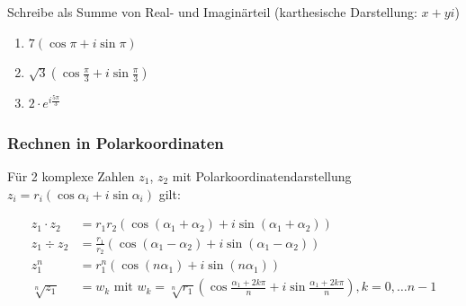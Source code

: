 \documentclass[11pt, a4paper]{article}
\newcommand\braces[1]{\left(#1\right)}
\newif\ifshowsolution
\begin{document}
Schreibe als Summe von Real- und Imaginärteil (karthesische Darstellung: $x + yi$)

\begin{enumerate}
	\item $7 \braces{\cos \pi + i \sin \pi}$
	
	\ifshowsolution
		\begin{align*}
			7 \braces{\cos \pi + i \sin \pi} &= 7 \braces{-1 + i 0} \\
			&= -7
		\end{align*}
	\fi
	
	\item $\sqrt{3} \braces{\cos \frac{\pi}{3} + i \sin \frac{\pi}{3}}$
	
	\ifshowsolution
		\begin{align*}
			\sqrt{3} \braces{\cos \frac{\pi}{3} + i \sin \frac{\pi}{3}} &= \sqrt{3} \braces{\frac{1}{2} + i \frac{\sqrt{3}}{2}} \\
			&= \frac{\sqrt{3}}{2} + i \frac{3}{2}
		\end{align*}
	\fi
	
	\item $2 \cdot e^{i \frac{5 \pi}{3}}$
	
	\ifshowsolution
		\begin{align*}
			2 \cdot e^{i \frac{5 \pi}{3}} &= 2 \braces{\cos \frac{5\pi}{3} + i \sin \frac{5\pi}{3}} \\
			&= 2 \braces{\frac{1}{2} - i \frac{\sqrt{3}}{2}} \\
			&= 1 - i \sqrt{3}
		\end{align*}
	\fi
\end{enumerate}

\subsubsection{Rechnen in Polarkoordinaten}
Für 2 komplexe Zahlen $z_1$, $z_2$ mit Polarkoordinatendarstellung $z_i = r_i \braces{\cos \alpha_i + i \sin \alpha_i}$ gilt:

\begin{align*}
	z_1 \cdot z_2 &= r_1 r_2 \braces{ \cos \braces{\alpha_1 + \alpha_2} + i \sin \braces{\alpha_1 + \alpha_2}} \\
z_1 \div z_2 &= \frac{r_1}{r_2} \braces{\cos \braces{\alpha_1 - \alpha_2} + i \sin \braces{\alpha_1 - \alpha_2}} \\
z_1^n &= r_1^n \braces{\cos (n \alpha_1) + i \sin (n \alpha_1)} \\
	\sqrt[n]{z_1} &= w_k \text{ mit } w_k = \sqrt[n]{r_1} \braces{\cos \frac{\alpha_1 + 2k\pi}{n} + i \sin \frac{\alpha_1 + 2k\pi}{n}}, k = 0, \dots n-1
\end{align*}
\end{document}
